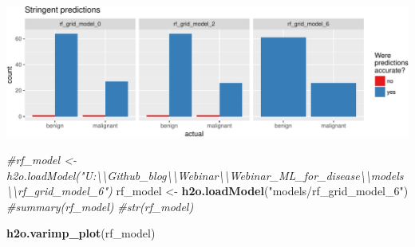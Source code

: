 \documentclass[]{article}
\newenvironment{Shaded}{\begin{snugshade}}{\end{snugshade}}
\newcommand{\KeywordTok}[1]{\textcolor[rgb]{0.13,0.29,0.53}{\textbf{{#1}}}}
\newcommand{\DataTypeTok}[1]{\textcolor[rgb]{0.13,0.29,0.53}{{#1}}}
\newcommand{\DecValTok}[1]{\textcolor[rgb]{0.00,0.00,0.81}{{#1}}}
\newcommand{\CharTok}[1]{\textcolor[rgb]{0.31,0.60,0.02}{{#1}}}
\newcommand{\StringTok}[1]{\textcolor[rgb]{0.31,0.60,0.02}{{#1}}}
\newcommand{\CommentTok}[1]{\textcolor[rgb]{0.56,0.35,0.01}{\textit{{#1}}}}
\newcommand{\NormalTok}[1]{{#1}}
\begin{document}
\begin{Shaded}
\end{Shaded}

\includegraphics{webinar_code_files/figure-latex/final_predictions_rf-2.pdf}

\begin{Shaded}
\begin{Highlighting}[]
\CommentTok{#rf_model <- h2o.loadModel("U:\textbackslash{}\textbackslash{}Github_blog\textbackslash{}\textbackslash{}Webinar\textbackslash{}\textbackslash{}Webinar_ML_for_disease\textbackslash{}\textbackslash{}models\textbackslash{}\textbackslash{}rf_grid_model_6")}
\NormalTok{rf_model <-}\StringTok{ }\KeywordTok{h2o.loadModel}\NormalTok{(}\StringTok{"models/rf_grid_model_6"}\NormalTok{)}
\CommentTok{#summary(rf_model)}
\CommentTok{#str(rf_model)}
\end{Highlighting}
\end{Shaded}

\begin{Shaded}
\begin{Highlighting}[]
\KeywordTok{h2o.varimp_plot}\NormalTok{(rf_model)}
\end{Highlighting}
\end{Shaded}
\end{document}
